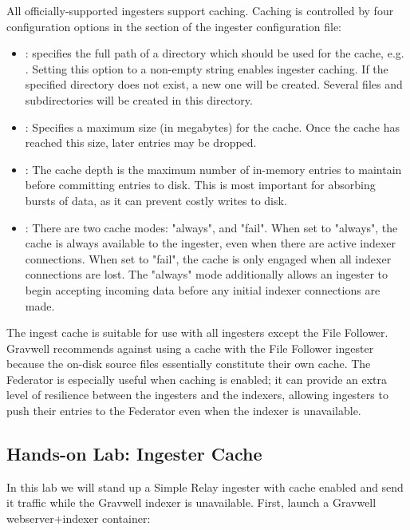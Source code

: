 All officially-supported ingesters support caching. Caching is
controlled by four configuration options in the \code{[Global]} section of
the ingester configuration file:

\begin{itemize}
\item
  : specifies the full path of a directory which should
  be used for the cache, e.g.
  . Setting this option to a
  non-empty string enables ingester caching. If the specified directory does
  not exist, a new one will be created. Several files and
  subdirectories will be created in this directory.
\item
  : Specifies a maximum size (in megabytes) for the
  cache. Once the cache has reached this size, later entries may be
  dropped.
\item
  : The cache depth is the maximum number of in-memory
  entries to maintain before committing entries to disk. This is
  most important for absorbing bursts of data, as it can prevent
  costly writes to disk.
\item
  : There are two cache modes: "always", and "fail". When set
  to "always", the cache is always available to the ingester,
  even when there are active indexer connections. When set to
  "fail", the cache is only engaged when all indexer connections
  are lost. The "always" mode additionally allows an ingester to begin
  accepting incoming data before any initial indexer connections
  are made.
\end{itemize}

The ingest cache is suitable for use with all ingesters except the File
Follower. Gravwell recommends against using a cache with the File
Follower ingester because the on-disk source files essentially
constitute their own cache. The Federator is especially useful when
caching is enabled; it can provide an extra level of resilience between
the ingesters and the indexers, allowing ingesters to push their entries
to the Federator even when the indexer is unavailable.

\subsection{Hands-on Lab: Ingester Cache}

In this lab we will stand up a Simple Relay ingester with cache enabled
and send it traffic while the Gravwell indexer is unavailable. First,
launch a Gravwell webserver+indexer container:

